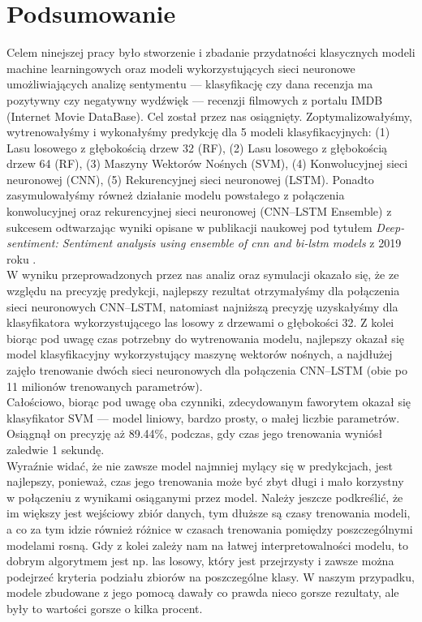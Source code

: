 \chapter{Podsumowanie}

Celem ninejszej pracy było stworzenie i zbadanie przydatności klasycznych modeli machine learningowych oraz modeli wykorzystujących sieci neuronowe umożliwiających analizę sentymentu --- klasyfikację czy dana recenzja ma pozytywny czy negatywny wydźwięk --- recenzji filmowych z portalu IMDB (Internet Movie DataBase).
Cel został przez nas osiągnięty. Zoptymalizowałyśmy, wytrenowałyśmy i wykonałyśmy predykcję dla 5 modeli klasyfikacyjnych: (1) Lasu losowego z głębokością drzew 32 (RF),
	(2) Lasu losowego z głębokością drzew 64 (RF),
	(3) Maszyny Wektorów Nośnych (SVM),
	(4) Konwolucyjnej sieci neuronowej (CNN),
	(5) Rekurencyjnej sieci neuronowej (LSTM). Ponadto zasymulowałyśmy równeż działanie modelu powstałego z połączenia konwolucyjnej oraz rekurencyjnej sieci neuronowej (CNN--LSTM Ensemble) z sukcesem odtwarzając wyniki opisane w publikacji naukowej pod tytułem \textit{Deep-sentiment: Sentiment analysis using ensemble of cnn and bi-lstm models} z 2019 roku \cite{minaee2019deep}. \\

\bigskip 
\noindent W wyniku przeprowadzonych przez nas analiz oraz symulacji okazało się, że ze względu na precyzję predykcji, najlepszy rezultat otrzymałyśmy dla połączenia sieci neuronowych CNN--LSTM, natomiast najniższą precyzję uzyskałyśmy dla klasyfikatora wykorzystującego las losowy z drzewami o głębokości 32. Z kolei biorąc pod uwagę czas potrzebny do wytrenowania modelu, najlepszy okazał się model klasyfikacyjny wykorzystujący maszynę wektorów nośnych, a najdłużej zajęło trenowanie dwóch sieci neuronowych dla połączenia CNN--LSTM (obie po 11 milionów trenowanych parametrów).\\
Całościowo, biorąc pod uwagę oba czynniki, zdecydowanym faworytem okazał się klasyfikator SVM --- model liniowy, bardzo prosty, o małej liczbie parametrów. Osiągnął on precyzję aż 89.44\%, podczas, gdy czas jego trenowania wyniósł zaledwie 1 sekundę.\\

\bigskip
\noindent Wyraźnie widać, że nie zawsze model najmniej mylący się w predykcjach, jest najlepszy, ponieważ, czas jego trenowania może być zbyt długi i mało korzystny w połączeniu z wynikami osiąganymi przez model. Należy jeszcze podkreślić, że im większy jest wejściowy zbiór danych, tym dłuższe są czasy trenowania modeli, a co za tym idzie również różnice w czasach trenowania pomiędzy poszczególnymi modelami rosną. Gdy z kolei zależy nam na łatwej interpretowalności modelu, to dobrym algorytmem jest np. las losowy, który jest przejrzysty i zawsze można podejrzeć kryteria podziału zbiorów na poszczególne klasy. W naszym przypadku, modele zbudowane z jego pomocą dawały co prawda nieco gorsze rezultaty, ale były to wartości gorsze o kilka procent. \\

